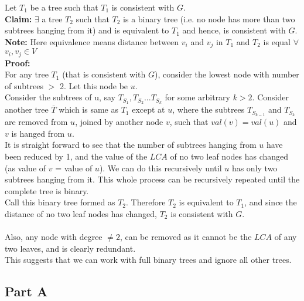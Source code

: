 \documentclass{article}
\begin{document}
    Let $T_1$ be a tree such that $T_1$ is consistent with $G$.
    \\
    \textbf{Claim:} $\exists$ a tree $T_2$ such that $T_2$ is a binary tree (i.e. no node has more than two subtrees hanging from it) and is equivalent to $T_1$ and hence, is consistent with $G$.
    \\
    \textbf{Note:} Here equivalence means distance between $v_i$ and $v_j$ in $T_1$ and $T_2$ is equal $\forall$ $v_i, v_j \in V$
    \\
    \textbf{Proof:}
    \\
    For any tree $T_1$ (that is consistent with $G$), consider the lowest node with number of subtrees $>$ 2. Let this node be $u$.
    \\
    Consider the subtrees of u, say $T_{S_1}, T_{S_2} ... T_{S_k}$ for some arbitrary $k > 2$. Consider another tree $\bar{T}$ which is same as $T_1$ except at $u$, where the subtrees $T_{S_{k-1}}$ and $T_{S_k}$ are removed from $u$, joined by another node $v$, such that $val(v) = val(u)$ and $v$ is hanged from $u$.
    \\
    It is straight forward to see that the number of subtrees hanging from $u$ have been reduced by 1, and the value of the $LCA$ of no two leaf nodes has changed (as value of $v$ = value of $u$). We can do this recursively until $u$ has only two subtrees hanging from it. This whole process can be recursively repeated until the complete tree is binary.
    \\
    Call this binary tree formed as $T_2$. Therefore $T_2$ is equivalent to $T_1$, and since the distance of no two leaf nodes has changed, $T_2$ is consistent with $G$.
    \\
    \\
    Also, any node with degree $\ne 2$, can be removed as it cannot be the $LCA$ of any two leaves, and is clearly redundant.
    \\
    This suggests that we can work with full binary trees and ignore all other trees.
    
    
    \subsection*{Part A}
    
\end{document}

